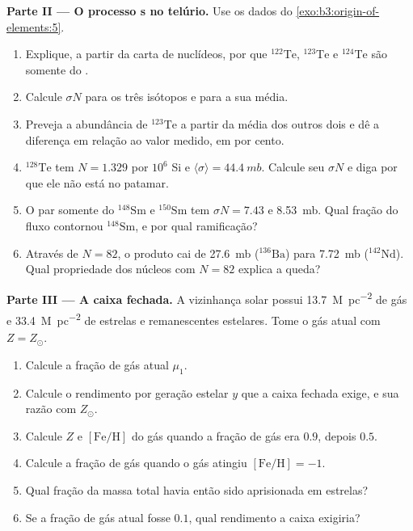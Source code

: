 \begin{problem}
\medskip\noindent\textbf{Parte II --- O processo s no telúrio.} Use
  os dados do \cref{exo:b3:origin-of-elements:5}.
\begin{enumerate}[resume]
\item Explique, a partir da carta de nuclídeos, por que $^{122}\mathrm{Te}$,
  $^{123}\mathrm{Te}$ e $^{124}\mathrm{Te}$ são somente do .
\item Calcule $\sigma N$ para os três isótopos e para a sua média.
\item Preveja a abundância de $^{123}\mathrm{Te}$ a partir da média dos
  outros dois e dê a diferença em relação ao valor medido, em por
  cento.
\item $^{128}\mathrm{Te}$ tem $N = 1.329$ por $10^6$ Si e
  $\langle\sigma\rangle = \qty{44.4}{mb}$. Calcule seu $\sigma N$ e
  diga por que ele não está no patamar.
\item O par somente do  $^{148}\mathrm{Sm}$ e $^{150}\mathrm{Sm}$ tem
  $\sigma N = \num{7.43}$ e \qty{8.53}{mb}. Qual fração do fluxo
  contornou $^{148}\mathrm{Sm}$, e por qual ramificação?
\item Através de $N = 82$, o produto cai de \qty{27.6}{mb}
  ($^{136}\mathrm{Ba}$) para \qty{7.72}{mb} ($^{142}\mathrm{Nd}$). Qual
  propriedade dos núcleos com $N = 82$ explica a queda?
\end{enumerate}

\medskip\noindent\textbf{Parte III --- A caixa fechada.} A vizinhança solar
possui \qty{13.7}{M_\odot.pc^{-2}} de gás e
\qty{33.4}{M_\odot.pc^{-2}} de estrelas e remanescentes estelares. Tome o
gás atual com $Z = Z_\odot$.
\begin{enumerate}[resume]
\item Calcule a fração de gás atual $\mu_1$.
\item Calcule o rendimento por geração estelar $y$ que a caixa fechada
  exige, e sua razão com $Z_\odot$.
\item Calcule $Z$ e $[\mathrm{Fe/H}]$ do gás quando a fração de gás
  era $0.9$, depois $0.5$.
\item Calcule a fração de gás quando o gás atingiu
  $[\mathrm{Fe/H}] = -1$.
\item Qual fração da massa total havia então sido aprisionada em estrelas?
\item Se a fração de gás atual fosse $0.1$, qual rendimento a caixa
  exigiria?
\end{enumerate}


\end{problem}
